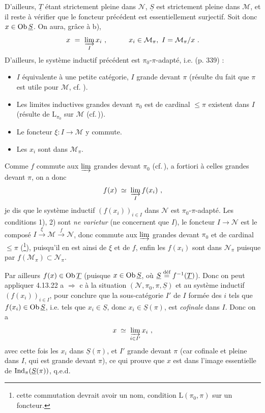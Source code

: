 D'ailleurs, $\underline{T}$ étant strictement pleine dans $\mathcal{N}$, $\underline{S}$ est strictement pleine dans $\mathcal{M}$, et il reste à vérifier que le foncteur précédent est essentiellement surjectif. Soit donc $x\in\Ob\underline{S}$. On aura, grâce à b),
\[ x\ =\ \varinjlim_{I}x_i\ ,\qquad\quad x_i\in\mathcal{M}_\pi,\ I=\mathcal{M}_\pi/x\ . \]
D'ailleurs, le système inductif précédent est $\pi_0$-$\pi$-adapté, i.e. (p. 339) :
\begin{itemize}[leftmargin=2.5em]
\item[1)] $I$ équivalente à une petite catégorie, $I$ grande devant $\pi$ (résulte du fait que $\pi$ est utile pour $\mathcal{M}$, cf.\,\,).
\end{itemize}

\begin{itemize}[leftmargin=2.5em]
\item[2)] Les limites inductives grandes devant $\pi_0$ est de cardinal $\leqslant \pi$ existent dans $I$ (résulte de $\mathrm{L}_{\pi_0}$ sur $\mathcal{M}$ (cf.\,)). %
\item[3)] Le foncteur $\xi : I \longrightarrow \mathcal{M}$ y commute.
\item[4)] Les $x_i$ sont dans $\mathcal{M}_\pi$.
\end{itemize}
Comme $f$ commute aux $\limind$ grandes devant $\pi_0$ (cf.\,), a fortiori à celles grandes devant $\pi$, on a donc
\[ f(x) \;\simeq\; \varinjlim_{I} f(x_i) \ , \]
je dis que le système inductif $(f(x_i))_{i\in I}$ dans $\mathcal{N}$ est $\pi_0$-$\pi$-adapté. Les conditions 1), 2) sont \textit{ne varietur} (ne concernent que $I$), le foncteur $I \longrightarrow \mathcal{N}$ est le composé $I \xrightarrow{\xi} \mathcal{M} \xrightarrow{f} \mathcal{N}$, donc commute aux $\limind$ grandes devant $\pi_0$ et de cardinal $\leqslant \pi$ (\footnote[155]{cette commutation devrait avoir un nom, condition $\mathrm{L}(\pi_0,\pi)$ sur un foncteur.}), puisqu'il en est ainsi de $\xi$ et de $f$, enfin les $f(x_i)$ sont dans $\mathcal{N}_\pi$ puisque par  $f(\mathcal{M}_\pi) \subset \mathcal{N}_\pi$.


Par ailleurs $f(x) \in \Ob \underline{T}$ (puisque $x \in \Ob \underline{S}$, où $\underline{S} \defeq f^{-1}(\underline{T})$). Donc on peut appliquer 4.13.22 a $\Longrightarrow$ c à la situation $(\mathcal{N}, \pi_0, \pi, \underline{S})$ et au système inductif $(f(x_i))_{i\in I}$, pour conclure que la sous-catégorie $I'$ de $I$ formée des $i$ tels que $f(x_i) \in \Ob \underline{S}$, i.e. tels que $x_i \in \underline{S}$, donc $x_i \in \underline{S}(\pi)$, est \textit{cofinale} dans $I$. Donc on a
\[ x \;\simeq\; \varinjlim_{i\in I'} x_i \ , \]
avec cette fois les $x_i$ dans $\underline{S}(\pi)$, et $I'$ grande devant $\pi$ (car cofinale et pleine dans $I$, qui est grande devant $\pi$), ce qui prouve que $x$ est dans l'image essentielle de $\Ind_\pi(\underline{S}(\pi))$, q.e.d.

